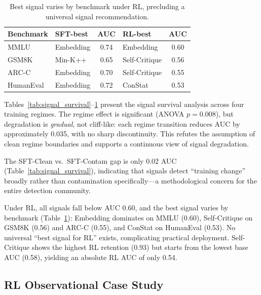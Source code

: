 \documentclass[letterpaper,11pt]{article}
\begin{document}
\begin{table}[t]
\centering
\caption{Best signal varies by benchmark under RL, precluding a universal signal recommendation.}
\label{tab:best_signal_regime}
\begin{tabular}{@{}llclc@{}}
\toprule
Benchmark & SFT-best & AUC & RL-best & AUC \\
\midrule
MMLU & Embedding & 0.74 & Embedding & 0.60 \\
GSM8K & Min-K++ & 0.65 & Self-Critique & 0.56 \\
ARC-C & Embedding & 0.70 & Self-Critique & 0.55 \\
HumanEval & Embedding & 0.72 & ConStat & 0.53 \\
\bottomrule
\end{tabular}
\end{table}

Tables~\ref{tab:signal_survival}--\ref{tab:best_signal_regime} present the signal survival analysis across four training regimes.
The regime effect is significant (ANOVA $p = 0.008$), but degradation is \emph{gradual}, not cliff-like: each regime transition reduces AUC by approximately 0.035, with no sharp discontinuity.
This refutes the assumption of clean regime boundaries and supports a continuous view of signal degradation.

The SFT-Clean vs.\ SFT-Contam gap is only 0.02 AUC (Table~\ref{tab:signal_survival}), indicating that signals detect ``training change'' broadly rather than contamination specifically---a methodological concern for the entire detection community.

Under RL, all signals fall below AUC 0.60, and the best signal varies by benchmark (Table~\ref{tab:best_signal_regime}): Embedding dominates on MMLU (0.60), Self-Critique on GSM8K (0.56) and ARC-C (0.55), and ConStat on HumanEval (0.53).
No universal ``best signal for RL'' exists, complicating practical deployment.
Self-Critique shows the highest RL retention (0.93) but starts from the lowest base AUC (0.58), yielding an absolute RL AUC of only 0.54.

\subsection{RL Observational Case Study}
\label{sec:rl_case}
\end{document}
